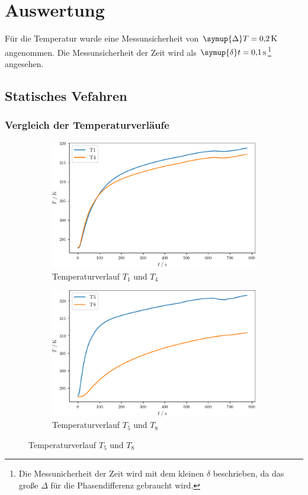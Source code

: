 \section{Auswertung}
\label{sec:Auswertung}
Für die Temperatur wurde eine Messunsicherheit von $\symup{\Delta} T = \SI{0.2}{\kelvin}$ angenommen. Die Messunsicherheit der Zeit wird als
$\symup{\delta} t = \SI{0.1}{\second}$\footnote{Die Messunicherheit der Zeit wird mit dem kleinen $\delta$ beschrieben, 
da das große $\Delta$ für die Phasendifferenz gebraucht wird.} angesehen.
\subsection{Statisches Vefahren}  
\subsubsection{Vergleich der Temperaturverläufe}
\begin{figure}
  \label{stat2}
  \begin{subfigure}{0.48\textwidth}
    \centering
    \includegraphics[width = \textwidth]{build/stat14.pdf}
    \caption{Temperaturverlauf $T_1$ und $T_4$}
    \label{fig:stat14}
  \end{subfigure}
  \begin{subfigure}{0.48\textwidth}
    \centering
    \includegraphics[width = \textwidth]{build/stat58.pdf}
    \caption{Temperaturverlauf $T_5$ und $T_8$}
    \label{fig:stat58}
  \end{subfigure}
\end{figure}

